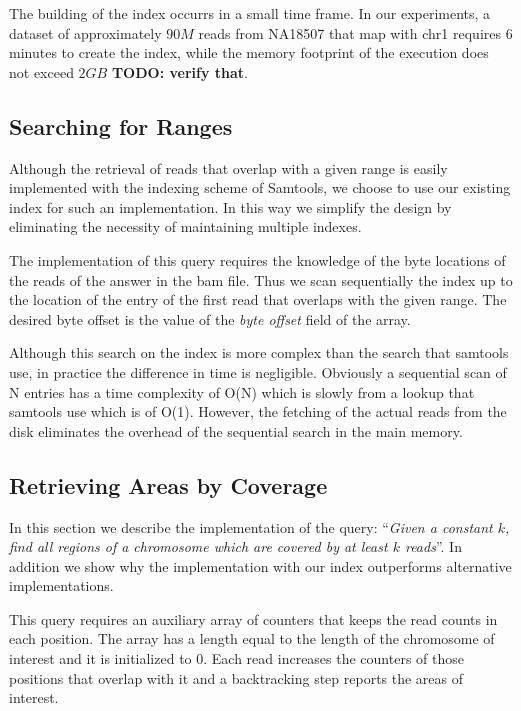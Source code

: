 \documentclass[10pt,fullpage]{article}
\begin{document}
The building of the index occurrs in a small time frame. In our
experiments, a dataset of approximately $90M$ reads from NA18507 
that map with chr1 requires $6$ minutes to create the index, while the
memory footprint of the execution does not exceed $2GB$ {\bf TODO:
verify that}.

\subsection{Searching for Ranges}
\label{sec:range}

Although the retrieval of reads that overlap with a given range is
easily implemented with the indexing scheme of Samtools, we choose to
use our existing index for such an implementation. In this way we simplify the
design by eliminating the necessity of maintaining multiple indexes.

The implementation of this query requires the knowledge of the byte
locations of the reads of the answer in the bam file. Thus we scan
sequentially the index up to the location of the entry of the first
read that overlaps with the given range. The desired byte offset is
the value of the {\em byte offset} field of the array.

Although this search on the index is more complex than the search that
samtools use, in practice the difference in time is negligible.
Obviously a sequential scan of N entries has a time complexity of O(N)
which is slowly from a lookup that samtools use which is of O(1).
However, the fetching of the actual reads from the disk eliminates the
overhead of the sequential search in the main memory.

\subsection{Retrieving Areas by Coverage}
\label{sec:coverage}
In this section we describe the implementation of the query: 
``{\em Given a constant $k$, find all regions of a chromosome which are
covered by at least $k$ reads}''. In addition we show why the
implementation with our index outperforms alternative implementations.

This query requires an auxiliary array of counters that keeps the
read counts in each position. The array has a length equal to the
length of the chromosome of interest and it is initialized to 0. Each
read increases the counters of those positions that overlap with it
and a backtracking step reports the areas of interest.
\end{document}
